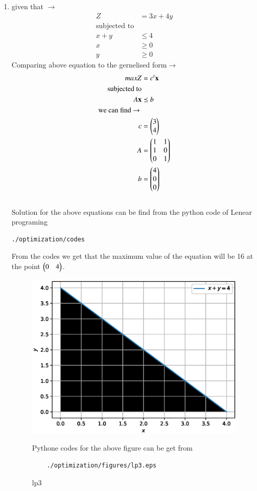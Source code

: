 \renewcommand{\theequation}{\theenumi}
\begin{enumerate}[label=\arabic*.,ref=\thesubsection.\theenumi]
\item given that $\to$
\begin{align}
Z &= 3x + 4y
\\
\text{subjected to}
\\
x + y &\leq 4
\\
x  &\geq 0
\\
y &\geq 0
\end{align}
Comparing above equation to the gernelised form$\to$ 
\begin{align}
maxZ &= c^t \mathbf{x}
\\
\text{subjected to}
\\
A\mathbf{x} &\preceq b
\\ 
\text{we can find $\to$ }
\\
c &= \begin{pmatrix}3\\ 4\end{pmatrix}
\\
A &= \begin{pmatrix}1 & 1 \\ 1 & 0 \\ 0 & 1\end{pmatrix}
\\
b &= \begin{pmatrix}4\\ 0\\ 0\end{pmatrix}
\end{align}\\
Solution for the above equations can be find from the python code of Lenear programing 
\begin{lstlisting}
./optimization/codes
\end{lstlisting}
From the codes we get that the maximum value of the equation will be 16 at the point $\begin{pmatrix}0 & 4\end{pmatrix}$.

\begin{figure}[!ht]
	\centering
	\includegraphics[width=\columnwidth]{./figures/lp3.eps}
	\caption{ lp3 }
	\label{fig:lp3}
	Pythone codes for the above figure can be get from
	\begin{lstlisting}
	./optimization/figures/lp3.eps
	\end{lstlisting}	
\end{figure}
\end{enumerate}